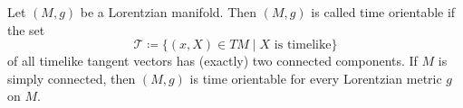 Let $(M, g)$ be a Lorentzian manifold. Then $(M, g)$ is called time orientable if the set
$$\mathcal{T} \coloneqq \{ (x, X) \in TM \mid X \text{ is timelike} \}$$
of all timelike tangent vectors has (exactly) two connected components. If $M$ is simply connected, then $(M, g)$ is time orientable for every Lorentzian metric $g$ on $M$.
